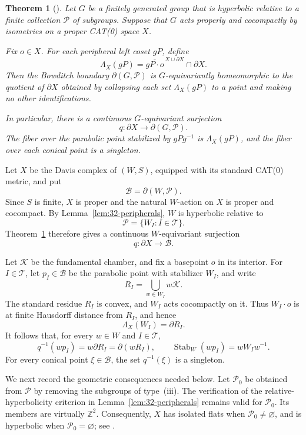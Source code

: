 \documentclass[11pt,reqno]{amsart}
\DeclareMathOperator{\Stab}{Stab}
\theoremstyle{plain}
\newtheorem{theorem}{Theorem}[section]
\theoremstyle{definition}
\theoremstyle{remark}
\numberwithin{equation}{section}
\begin{document}
    \begin{theorem}[{\cite[Main Theorem]{Tran}}]
\label{thm:tran-boundary}
Let $G$ be a finitely generated group that is hyperbolic
relative to a finite collection $\mathcal P$ of subgroups.
Suppose that $G$ acts properly and cocompactly by isometries
on a proper CAT(0) space $X$.

Fix $o\in X$. For each peripheral left coset $gP$, define
\[
    \Lambda_X(gP)
    =
    \overline{gP\cdot o}^{\,X\cup\partial X}\cap\partial X.
\]
Then the Bowditch boundary $\partial(G,\mathcal P)$ is
$G$-equivariantly homeomorphic to the quotient of
$\partial X$ obtained by collapsing each set
$\Lambda_X(gP)$ to a point and making no other
identifications.

In particular, there is a continuous $G$-equivariant
surjection
\[
    q:\partial X\longrightarrow\partial(G,\mathcal P).
\]
The fiber over the parabolic point stabilized by
$gPg^{-1}$ is $\Lambda_X(gP)$, and the fiber over
each conical point is a singleton.
\end{theorem}

Let $X$ be the Davis complex of $(W,S)$, equipped with
its standard CAT(0) metric, and put
\[
    \mathcal B=\partial(W,\mathcal P).
\]
Since $S$ is finite, $X$ is proper and the natural
$W$-action on $X$ is proper and cocompact.
By Lemma~\ref{lem:32-peripherals}, $W$ is hyperbolic
relative to
\[
    \mathcal P=\{W_I:I\in\mathcal T\}.
\]
Theorem~\ref{thm:tran-boundary} therefore gives a
continuous $W$-equivariant surjection
\[
    q:\partial X\longrightarrow\mathcal B.
\]

Let $\mathscr K$ be the fundamental chamber, and fix
a basepoint $o$ in its interior.
For $I\in\mathcal T$, let $p_I\in\mathcal B$ be the
parabolic point with stabilizer $W_I$, and write
\[
    R_I=\bigcup_{w\in W_I}w\mathscr K.
\]
The standard residue $R_I$ is convex, and $W_I$ acts
cocompactly on it. Thus $W_I\cdot o$ is at finite
Hausdorff distance from $R_I$, and hence
\[
    \Lambda_X(W_I)=\partial R_I.
\]
It follows that, for every $w\in W$ and $I\in\mathcal T$,
\begin{equation}\label{eq:32-tran-fibers}
    q^{-1}(wp_I)=w\partial R_I=\partial(wR_I),
    \qquad
    \Stab_W(wp_I)=wW_Iw^{-1}.
\end{equation}
For every conical point $\xi\in\mathcal B$, the set
$q^{-1}(\xi)$ is a singleton.

We next record the geometric consequences needed below.
Let $\mathcal P_0$ be obtained from $\mathcal P$ by
removing the subgroups of type~\textup{(iii)}.
The verification of the relative-hyperbolicity criterion
in Lemma~\ref{lem:32-peripherals} remains valid for
$\mathcal P_0$.
Its members are virtually $\mathbb Z^2$.
Consequently, $X$ has isolated flats when
$\mathcal P_0\neq\varnothing$, and is hyperbolic when
$\mathcal P_0=\varnothing$; see
\cite[Theorem~1.2.1]{HK}.
\end{document}
